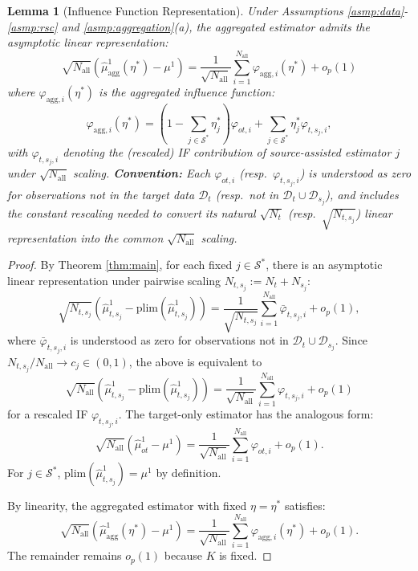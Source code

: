 \documentclass{article}
\newtheorem{lemma}[theorem]{Lemma}
\begin{document}
\begin{lemma}[Influence Function Representation]\label{lem:if_agg}
Under Assumptions \ref{asmp:data}-\ref{asmp:rsc} and \ref{asmp:aggregation}(a), the aggregated estimator admits the asymptotic linear representation:
\[
\sqrt{N_{\mathrm{all}}}\left( \widehat{\mu}^1_{\text{agg}}(\eta^*) - \mu^1 \right) = \frac{1}{\sqrt{N_{\mathrm{all}}}} \sum_{i=1}^{N_{\mathrm{all}}} \varphi_{\mathrm{agg},i}(\eta^*) + o_p(1)
\]
where $\varphi_{\mathrm{agg},i}(\eta^*)$ is the aggregated influence function:
\[
\varphi_{\mathrm{agg},i}(\eta^*) = \left(1-\sum_{j\in\mathcal{S}^*}\eta_j^*\right)\varphi_{ot,i} + \sum_{j\in\mathcal{S}^*}\eta_j^* \varphi_{t,s_j,i},
\]
with $\varphi_{t,s_j,i}$ denoting the (rescaled) IF contribution of source-assisted estimator $j$ under $\sqrt{N_{\mathrm{all}}}$ scaling.
\textbf{Convention:} Each $\varphi_{ot,i}$ (resp.\ $\varphi_{t,s_j,i}$) is understood as zero for observations not in the target data $\mathcal{D}_t$ (resp.\ not in $\mathcal{D}_t\cup\mathcal{D}_{s_j}$), and includes the constant rescaling needed to convert its natural $\sqrt{N_t}$ (resp.\ $\sqrt{N_{t,s_j}}$) linear representation into the common $\sqrt{N_{\mathrm{all}}}$ scaling.
\end{lemma}

\begin{proof}
By Theorem \ref{thm:main}, for each fixed $j\in\mathcal{S}^*$, there is an asymptotic linear representation under pairwise scaling $N_{t,s_j}:=N_t+N_{s_j}$:
\[
\sqrt{N_{t,s_j}}(\widehat{\mu}^1_{t,s_j} - \text{plim}(\widehat{\mu}^1_{t,s_j})) = \frac{1}{\sqrt{N_{t,s_j}}} \sum_{i=1}^{N_{\mathrm{all}}} \bar{\varphi}_{t,s_j,i} + o_p(1),
\]
where $\bar{\varphi}_{t,s_j,i}$ is understood as zero for observations not in $\mathcal{D}_t\cup\mathcal{D}_{s_j}$. Since $N_{t,s_j}/N_{\mathrm{all}}\to c_j\in(0,1)$, the above is equivalent to
\[
\sqrt{N_{\mathrm{all}}}(\widehat{\mu}^1_{t,s_j} - \text{plim}(\widehat{\mu}^1_{t,s_j})) = \frac{1}{\sqrt{N_{\mathrm{all}}}} \sum_{i=1}^{N_{\mathrm{all}}} \varphi_{t,s_j,i} + o_p(1)
\]
for a rescaled IF $\varphi_{t,s_j,i}$. The target-only estimator has the analogous form:
\[
\sqrt{N_{\mathrm{all}}}(\widehat{\mu}^1_{ot} - \mu^1) = \frac{1}{\sqrt{N_{\mathrm{all}}}} \sum_{i=1}^{N_{\mathrm{all}}} \varphi_{ot,i} + o_p(1).
\]
For $j \in \mathcal{S}^*$, $\text{plim}(\widehat{\mu}^1_{t,s_j})=\mu^1$ by definition.

By linearity, the aggregated estimator with fixed $\eta = \eta^*$ satisfies:
\[
\sqrt{N_{\mathrm{all}}}(\widehat{\mu}^1_{\text{agg}}(\eta^*) - \mu^1) = \frac{1}{\sqrt{N_{\mathrm{all}}}} \sum_{i=1}^{N_{\mathrm{all}}} \varphi_{\mathrm{agg},i}(\eta^*) + o_p(1).
\]
The remainder remains $o_p(1)$ because $K$ is fixed.
\end{proof}
\end{document}
